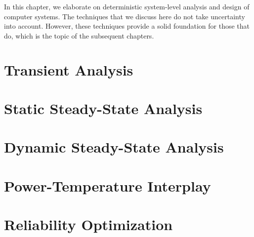 In this chapter, we elaborate on deterministic system-level analysis and design
of computer systems. The techniques that we discuss here do not take uncertainty
into account. However, these techniques provide a solid foundation for those
that do, which is the topic of the subsequent chapters.

\section{\introductiontitle}

\section{Transient Analysis}

\section{Static Steady-State Analysis}

\section{Dynamic Steady-State Analysis}

\section{Power-Temperature Interplay}

\section{Reliability Optimization}

\section{\conclusiontitle}
